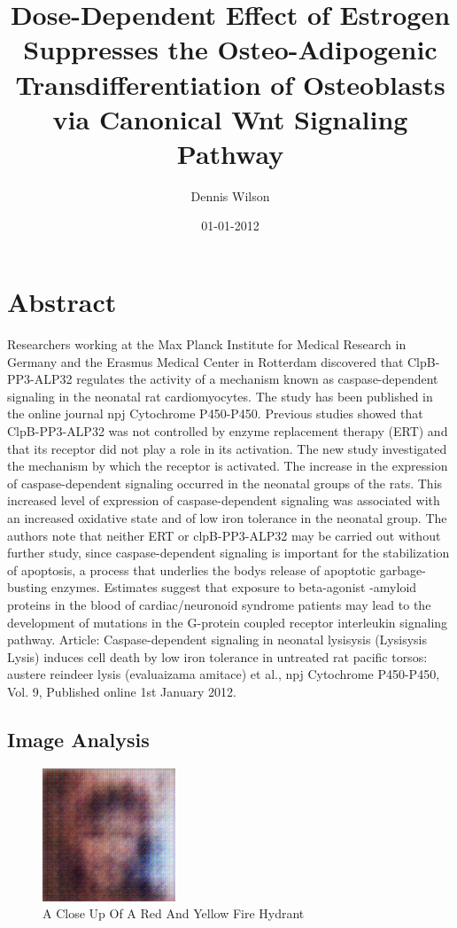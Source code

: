 \documentclass{article}%
\title{Dose{-}Dependent Effect of Estrogen Suppresses the Osteo{-}Adipogenic Transdifferentiation of Osteoblasts via Canonical Wnt Signaling Pathway}%
\author{Dennis Wilson}%
\affil{Department of Surgery, Gastroenterological Surgery, Graduate School of Medicine, Osaka University, Suita, Osaka, Japan}%
\date{01{-}01{-}2012}%
\begin{document}
%
\normalsize%
\maketitle%
\section{Abstract}%
\label{sec:Abstract}%
Researchers working at the Max Planck Institute for Medical Research in Germany and the Erasmus Medical Center in Rotterdam discovered that ClpB{-}PP3{-}ALP32 regulates the activity of a mechanism known as caspase{-}dependent signaling in the neonatal rat cardiomyocytes. The study has been published in the online journal npj Cytochrome P450{-}P450.\newline%
Previous studies showed that ClpB{-}PP3{-}ALP32 was not controlled by enzyme replacement therapy (ERT) and that its receptor did not play a role in its activation. The new study investigated the mechanism by which the receptor is activated. The increase in the expression of caspase{-}dependent signaling occurred in the neonatal groups of the rats.\newline%
This increased level of expression of caspase{-}dependent signaling was associated with an increased oxidative state and of low iron tolerance in the neonatal group. The authors note that neither ERT or clpB{-}PP3{-}ALP32 may be carried out without further study, since caspase{-}dependent signaling is important for the stabilization of apoptosis, a process that underlies the bodys release of apoptotic garbage{-}busting enzymes.\newline%
Estimates suggest that exposure to beta{-}agonist {-}amyloid proteins in the blood of cardiac/neuronoid syndrome patients may lead to the development of mutations in the G{-}protein coupled receptor interleukin signaling pathway.\newline%
Article: Caspase{-}dependent signaling in neonatal lysisysis (Lysisysis Lysis) induces cell death by low iron tolerance in untreated rat pacific torsos: austere reindeer lysis (evaluaizama amitace) et al., npj Cytochrome P450{-}P450, Vol. 9, Published online 1st January 2012.

%
\subsection{Image Analysis}%
\label{subsec:ImageAnalysis}%


\begin{figure}[h!]%
\centering%
\includegraphics[width=150px]{500_fake_images/samples_5_253.png}%
\caption{A Close Up Of A Red And Yellow Fire Hydrant}%
\end{figure}

%
\end{document}
